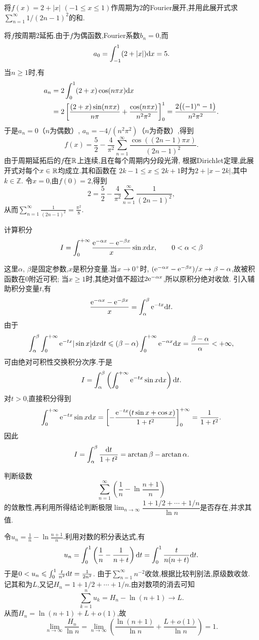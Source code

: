 \documentclass{ctexart}
\begin{document}
\begin{problem}[5.(15\songti{分})]
将$f(x)=2+|x|$ $(-1\leqslant x\leqslant1)$作周期为$2$的Fourier展开,并用此展开式求$\displaystyle\sum_{n=1}^{\infty}1/(2n-1)^2$的和.
\end{problem}
\begin{solution}
将$f$按周期$2$延拓.由于$f$为偶函数,Fourier系数$b_n=0$,而
\[a_0=\int_{-1}^1(2+|x|)\mathrm{d} x=5.\]
当$n\geqslant1$时,有
\[\begin{aligned}
a_n&=2\int_0^1(2+x)\cos(n\pi x)\mathrm{d} x\\
&=2\left[\frac{(2+x)\sin(n\pi x)}{n\pi}
+\frac{\cos(n\pi x)}{n^2\pi^2}\right]_0^1
=\frac{2\big((-1)^n-1\big)}{n^2\pi^2}.
\end{aligned}\]
于是$a_n=0$（$n$为偶数）, $a_n=-4/(n^2\pi^2)$（$n$为奇数）,得到
\[f(x)=\frac52-\frac4{\pi^2}\sum_{n=1}^{\infty}
\frac{\cos((2n-1)\pi x)}{(2n-1)^2}.\]
由于周期延拓后的$f$在$\mathbb{R}$上连续,且在每个周期内分段光滑,
根据Dirichlet定理,此展开式对每个$x\in\mathbb{R}$均成立.其和函数在
$2k-1\leqslant x\leqslant2k+1$时为$2+|x-2k|$,其中$k\in\mathbb Z$.
令$x=0$,由$f(0)=2$,得到
\[2=\frac52-\frac4{\pi^2}\sum_{n=1}^{\infty}\frac1{(2n-1)^2},\]
从而$\displaystyle\sum_{n=1}^{\infty}\frac1{(2n-1)^2}=\frac{\pi^2}{8}$.
\end{solution}
\begin{problem}[6.(15\songti{分})]
计算积分
\[I=\int_0^{+\infty}\frac{\mathrm{e}^{-\alpha x}-\mathrm{e}^{-\beta x}}x\sin x\mathrm{d} x,
\qquad 0<\alpha<\beta\]
\end{problem}
\begin{solution}
这里$\alpha$, $\beta$是固定参数,$x$是积分变量.当$x\to0^+$时,
$(\mathrm{e}^{-\alpha x}-\mathrm{e}^{-\beta x})/x\to\beta-\alpha$,故被积函数在$0$附近可积;
当$x\geqslant1$时,其绝对值不超过$2\mathrm{e}^{-\alpha x}$,所以原积分绝对收敛.
引入辅助积分变量$t$,有
\[\frac{\mathrm{e}^{-\alpha x}-\mathrm{e}^{-\beta x}}x=\int_\alpha^\beta\mathrm{e}^{-tx}\mathrm{d} t.\]
由于
\[\int_\alpha^\beta\int_0^{+\infty}\mathrm{e}^{-tx}|\sin x|\mathrm{d} x\mathrm{d} t
\leqslant(\beta-\alpha)\int_0^{+\infty}\mathrm{e}^{-\alpha x}\mathrm{d} x
=\frac{\beta-\alpha}{\alpha}<+\infty,\]
可由绝对可积性交换积分次序.于是
\[I=\int_\alpha^\beta\left(\int_0^{+\infty}\mathrm{e}^{-tx}\sin x\mathrm{d} x\right)\mathrm{d} t.\]
对$t>0$,直接积分得到
\[\int_0^{+\infty}\mathrm{e}^{-tx}\sin x\mathrm{d} x
=\left[-\frac{\mathrm{e}^{-tx}(t\sin x+\cos x)}{1+t^2}\right]_0^{+\infty}
=\frac1{1+t^2}.\]
因此
\[I=\int_\alpha^\beta\frac{\mathrm{d} t}{1+t^2}=\arctan\beta-\arctan\alpha.\]
\end{solution}
\begin{problem}[7.(10\songti{分})]
判断级数
\[\sum_{n=1}^{\infty}\left(\frac1n-\ln\frac{n+1}{n}\right)\]
的敛散性,再利用所得结论判断极限$\displaystyle\lim_{n\to\infty}\dfrac{1+1/2+\cdots+1/n}{\ln n}$是否存在,并求其值.
\end{problem}
\begin{solution}
令$\displaystyle u_n=\frac1n-\ln\frac{n+1}{n}$.利用对数的积分表达式,有
\[u_n=\int_0^1\left(\frac1n-\frac1{n+t}\right)\mathrm{d} t
=\int_0^1\frac{t}{n(n+t)}\mathrm{d} t.\]
于是$0<u_n\leqslant\int_0^1\frac{t}{n^2}\mathrm{d} t=\frac1{2n^2}$.
由于$\sum_{n=1}^{\infty}n^{-2}$收敛,根据比较判别法,原级数收敛.
记其和为$L$,又记$H_n=1+1/2+\cdots+1/n$.由对数项的消去可知
\[\sum_{k=1}^nu_k=H_n-\ln(n+1)\to L.\]
从而$H_n=\ln(n+1)+L+o(1)$,故
\[\lim_{n\to\infty}\frac{H_n}{\ln n}
=\lim_{n\to\infty}\left(\frac{\ln(n+1)}{\ln n}
+\frac{L+o(1)}{\ln n}\right)=1.\]
\end{solution}
\end{document}

